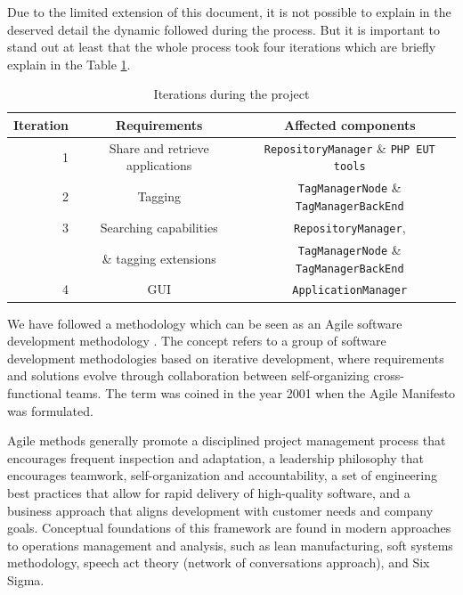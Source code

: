 Due to the limited extension of this document, it is not possible to explain in
the deserved detail the dynamic followed during the process. But it is
important to stand out at least that the whole process took four iterations
which are briefly explain in the Table \ref{table:iterations}.

\begin{table}[h]
	\small
	\centering
	\begin{tabular}{||r|c|c||}
	\hline \hline
	Iteration & Requirements & Affected components
	\\
	\hline
	\hline 
	1 & Share and retrieve applications & \texttt{RepositoryManager} \& \texttt{PHP
	EUT tools}\\
	\hline
	2 & Tagging & \texttt{TagManagerNode} \& \texttt{TagManagerBackEnd} \\
	\hline
	3 & Searching capabilities & \texttt{RepositoryManager},\\
	  &	\& tagging extensions &\texttt{TagManagerNode} \& \texttt{TagManagerBackEnd}\\
	\hline
	4 & GUI & \texttt{ApplicationManager} \\
	\hline \hline
	\end{tabular}
	\caption{\label{table:iterations}Iterations during the project}
\end{table}

We have followed a methodology which can be seen as an Agile software
development methodology \cite{agile-paper}. The concept refers to a group of
software development methodologies based on iterative development, where requirements and  solutions
evolve through collaboration between self-organizing cross-functional teams. 
The term was coined in the year 2001 when the Agile Manifesto
\cite{agile-manifesto} was formulated.

Agile methods generally promote a disciplined project management  process that
encourages frequent inspection and adaptation, a leadership philosophy  that
encourages teamwork, self-organization and accountability, a set of 
engineering best practices that allow for rapid delivery of high-quality 
software, and a business approach that aligns development with customer needs
and company goals. Conceptual foundations of this framework are found in 
modern approaches to operations management and analysis, such as lean 
manufacturing, soft systems methodology, speech act theory (network of 
conversations approach), and Six Sigma.

